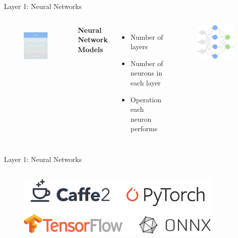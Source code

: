 \documentclass{beamer}
\begin{document}
\begin{frame}{Layer 1: Neural Networks}

\begin{columns}

\begin{figure}
    \centering
    \includegraphics[width=3.5cm]{images/models.pdf}
    \label{fig:inference-stack-models}
\end{figure}


\textbf{Neural Network Models}

\begin{itemize}
    \item Number of layers
    \item Number of neurons in each layer
    \item Operation each neuron performs
\end{itemize}

\begin{figure}
    \centering
    \includegraphics[width=5.5cm]{images/neural_network.pdf}
\end{figure}

\end{columns}


\end{frame}


\begin{frame}{Layer 1: Neural Networks}
\vspace{0.2cm}

\inputminted[bgcolor=bg, fontfamily=cmss]{python}{images/mini_model.py}

\begin{figure}
    \centering
    \vspace{-1cm}
    \includegraphics[width=10cm]{images/lgoos.pdf}
\end{figure}
\end{frame}
\end{document}
